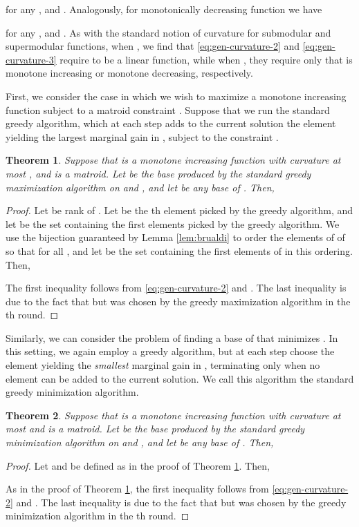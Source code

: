 \documentclass{article}
\newtheorem{theorem}{Theorem}[section]
\theoremstyle{definition}
\begin{document}
for any , and .    
Analogously,  for monotonically decreasing function  we have

for any , and .
As with the standard notion of curvature for submodular and supermodular functions, when , we find that \eqref{eq:gen-curvature-2} and  \eqref{eq:gen-curvature-3} require  to be a linear function, while when , they require only that  is monotone increasing or monotone decreasing, respectively.

First, we consider the case in which we wish to maximize a monotone increasing function  subject to a matroid constraint .  Suppose that we run the standard greedy algorithm, which at each step adds to the current solution  the element  yielding the largest marginal gain in , subject to the constraint .
\begin{theorem}
\label{thm:arbitrary-max}
Suppose that  is a monotone increasing function with curvature at most , and  is a matroid.  Let  be the base produced by the standard greedy maximization algorithm on  and , and let  be any base of .  Then, 

\end{theorem}

\begin{proof}
Let  be rank of .  Let  be the th element picked by the greedy algorithm, and let  be the set containing the first  elements picked by the greedy algorithm.  We use the bijection guaranteed by Lemma \ref{lem:brualdi} to order the elements of  of  so that  for all , and let  be the set containing the first  elements of  in this ordering.  Then, 

The first inequality follows from \eqref{eq:gen-curvature-2} and .  The last inequality is due to the fact that  but  was chosen by the greedy maximization algorithm in the th round.
\end{proof}

Similarly, we can consider the problem of finding a base of  that minimizes .  In this setting, we again employ a greedy algorithm, but at each step choose the element  yielding the \emph{smallest} marginal gain in , terminating only when no element can be added to the current solution.  We call this algorithm the standard greedy minimization algorithm.

\begin{theorem}
\label{thm:arbitrary-min}
Suppose that  is a monotone increasing function with curvature at most  and  is a matroid.  Let  be the base produced by the standard greedy minimization algorithm on  and , and let  be any base of .  Then,

\end{theorem}
\begin{proof}
Let  and  be defined as in the proof of Theorem \ref{thm:arbitrary-max}.  Then, 

As in the proof of Theorem \ref{thm:arbitrary-max}, the first inequality follows from \eqref{eq:gen-curvature-2} and .  The last inequality is due to the fact that  but  was chosen by the greedy minimization algorithm in the th round.
\end{proof}
\end{document}
